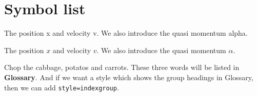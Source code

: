 \documentclass{mythesis}
\begin{document}
\section{Symbol list}

The position \gls{x} and velocity \gls{v}. We also introduce the quasi momentum \gls{alpha}.

The position $x$ and velocity $v$. We also introduce the quasi momentum $\alpha$.

Chop the \gls{cabbage}, \glspl{potato} and \glspl{carrot}. These three words will 
be listed in \textbf{Glossary}. And if we want a style which shows the group headings
in Glossary, then we can add \texttt{style=indexgroup}.

\printglossaries
\end{document}
